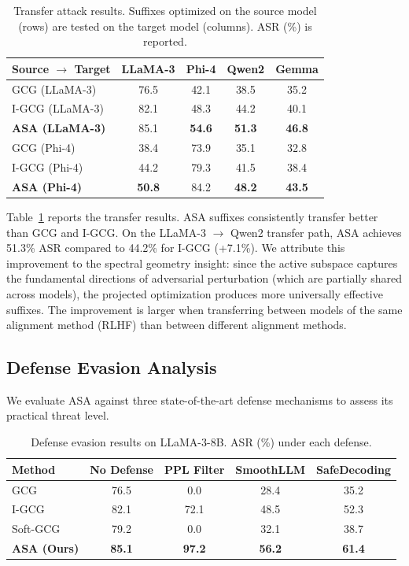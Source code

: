 \documentclass[preprint,12pt]{elsarticle}
\begin{document}
\begin{table}[t]
\centering
\caption{Transfer attack results. Suffixes optimized on the source model (rows) are tested on the target model (columns). ASR (\%) is reported.}
\label{tab:transfer}
\begin{tabular}{lcccc}
\toprule
\textbf{Source $\to$ Target} & \textbf{LLaMA-3} & \textbf{Phi-4} & \textbf{Qwen2} & \textbf{Gemma} \\
\midrule
GCG (LLaMA-3) & 76.5 & 42.1 & 38.5 & 35.2 \\
I-GCG (LLaMA-3) & 82.1 & 48.3 & 44.2 & 40.1 \\
\rowcolor[gray]{0.9}
\textbf{ASA (LLaMA-3)} & 85.1 & \textbf{54.6} & \textbf{51.3} & \textbf{46.8} \\
\midrule
GCG (Phi-4) & 38.4 & 73.9 & 35.1 & 32.8 \\
I-GCG (Phi-4) & 44.2 & 79.3 & 41.5 & 38.4 \\
\rowcolor[gray]{0.9}
\textbf{ASA (Phi-4)} & \textbf{50.8} & 84.2 & \textbf{48.2} & \textbf{43.5} \\
\bottomrule
\end{tabular}
\end{table}

Table~\ref{tab:transfer} reports the transfer results. ASA suffixes consistently transfer better than GCG and I-GCG. On the LLaMA-3 $\to$ Qwen2 transfer path, ASA achieves 51.3\% ASR compared to 44.2\% for I-GCG (+7.1\%). We attribute this improvement to the spectral geometry insight: since the active subspace captures the fundamental directions of adversarial perturbation (which are partially shared across models), the projected optimization produces more universally effective suffixes. The improvement is larger when transferring between models of the same alignment method (RLHF) than between different alignment methods.

\subsection{Defense Evasion Analysis}
\label{sec:defense}

We evaluate ASA against three state-of-the-art defense mechanisms to assess its practical threat level.

\begin{table}[t]
\centering
\caption{Defense evasion results on LLaMA-3-8B. ASR (\%) under each defense.}
\label{tab:defense}
\begin{tabular}{lcccc}
\toprule
\textbf{Method} & \textbf{No Defense} & \textbf{PPL Filter} & \textbf{SmoothLLM} & \textbf{SafeDecoding} \\
\midrule
GCG & 76.5 & 0.0 & 28.4 & 35.2 \\
I-GCG & 82.1 & 72.1 & 48.5 & 52.3 \\
Soft-GCG & 79.2 & 0.0 & 32.1 & 38.7 \\
\rowcolor[gray]{0.9}
\textbf{ASA (Ours)} & \textbf{85.1} & \textbf{97.2} & \textbf{56.2} & \textbf{61.4} \\
\bottomrule
\end{tabular}
\end{table}
\end{document}
